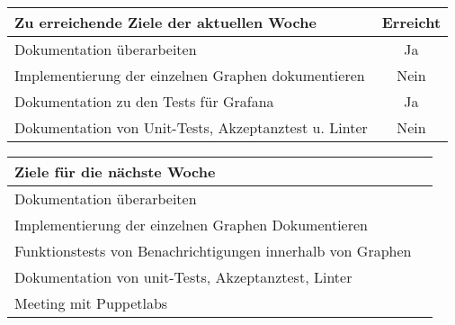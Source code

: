 \begin{tabularx}{\textwidth}{Xc}
    \arrayrulecolor{OliveGreen}
    \toprule
    {\bfseries Zu erreichende Ziele der aktuellen Woche} & {\bfseries Erreicht} \\
    \midrule[2pt]
    Dokumentation überarbeiten                              &Ja              \\
    \rowcolor{OliveGreen!15}
    Implementierung der einzelnen Graphen dokumentieren     &Nein            \\
    \rowcolor{White}
    Dokumentation zu den Tests für Grafana                  &Ja              \\
    \rowcolor{OliveGreen!15}
    Dokumentation von Unit-Tests, Akzeptanztest u. Linter   &Nein            \\
   \bottomrule[2pt]
\end{tabularx}
%
\vspace{1cm}
%
\begin{tabularx}{\textwidth}{Xc}
    \arrayrulecolor{OliveGreen}
    \toprule
    {\bfseries Ziele für die nächste Woche}        &                         \\
    \midrule[2pt]
    Dokumentation überarbeiten                     &                         \\
    \rowcolor{OliveGreen!15}
    Implementierung der einzelnen Graphen Dokumentieren   &                  \\
    \rowcolor{White}
    Funktionstests von Benachrichtigungen innerhalb von Graphen  &           \\
    \rowcolor{OliveGreen!15}
    Dokumentation von unit-Tests, Akzeptanztest, Linter &                    \\
    \rowcolor{White}
    Meeting mit Puppetlabs                             &                    \\
\end{tabularx}
